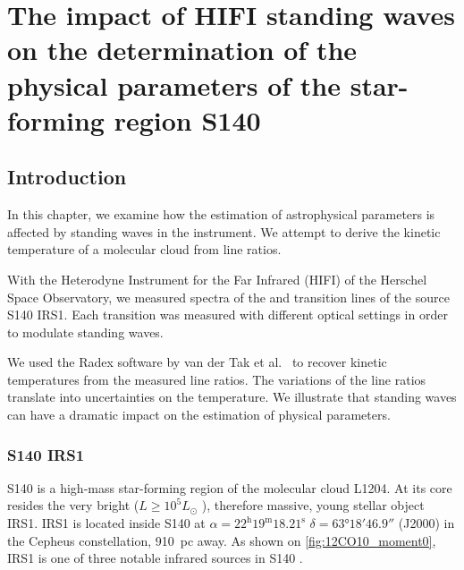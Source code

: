 \cleardoublepage
\chapter{The impact of HIFI standing waves on the determination of the physical parameters of the star-forming region S140}
\label{sec:chapter5}
\section{Introduction}

In this chapter, we examine how the estimation of astrophysical parameters is affected by standing waves in the instrument.
We attempt to derive the kinetic temperature of a molecular cloud from  line ratios.

With the Heterodyne Instrument for the Far Infrared (HIFI) of the Herschel Space Observatory,
we measured spectra of the  and  transition lines of the source S140 IRS1.
Each transition was measured with different optical settings in order to modulate standing waves.

We used the Radex software by van der Tak et al.\ \cite{vandertak2007radex} to recover kinetic temperatures from the measured line ratios.
The variations of the line ratios translate into uncertainties on the temperature.
We illustrate that standing waves can have a dramatic impact on the estimation of physical parameters.

\subsection{S140 IRS1}
S140 is a high-mass star-forming region of the molecular cloud L1204.
At its core resides the very bright ($L \geqslant 10^5 L_{\odot}$ \cite{demuizon1980}), therefore massive, young stellar object IRS1.
IRS1 is located inside S140 at $\alpha = 22^\text{h} 19^\text{m} 18.21^\text{s}$ $\delta = \ang{63;18;46.9}$ (J2000) in the Cepheus constellation, \SI{910}{pc} away.
As shown on \cref{fig:12CO10_moment0}, IRS1 is one of three notable infrared sources in S140 \cite{maud2013s140}.

